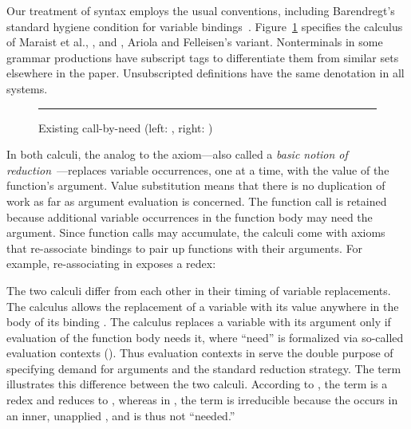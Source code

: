 \documentclass[runningheads,a4paper]{llncs}
\begin{document}
 Our treatment of syntax employs the usual
 conventions, including Barendregt's standard hygiene condition
 for variable bindings~\cite{Barendregt1985LC}. Figure~\ref{fig:lneeds}
 specifies the calculus of Maraist et al., \lmow, and \laf,
 Ariola and Felleisen's variant. Nonterminals in some grammar productions have
 subscript tags to differentiate them from similar sets elsewhere in the
 paper. Unsubscripted definitions have the same denotation in all systems.

\newcommand{\smallmid}{\hspace{-.5pt}\mid\hspace{-0.5pt}}
\begin{figure}[htbp]
\vspace{-10pt}
\hspace{-14pt}\begin{minipage}[b]{0.49\linewidth}
  

\end{minipage}
\rule[-6pt]{.1pt}{4.5cm}
\hspace{-4pt}\begin{minipage}[b]{0.55\linewidth}
  

\end{minipage}
\vspace{-10pt}
  \caption{Existing call-by-need \lcs (left: \lmow, right: \laf)}
  \label{fig:lneeds}
\vspace{-10pt}
\end{figure}

In both calculi, the analog to the  axiom---also called a
 \textit{basic notion of reduction}~\cite{Barendregt1985LC}---replaces variable
 occurrences, one at a time, with the value 
 of the function's argument. Value substitution means that there is no
 duplication of work as far as argument evaluation is concerned. The function
 call is retained because additional variable occurrences in the function
 body may need the argument.
 Since function calls may accumulate, the calculi come with axioms
 that re-associate bindings to
 pair up functions with their arguments. For example,
 re-associating  in
 \laf exposes a \derefnr redex:
{

}

The two calculi differ from each other in their timing of variable
 replacements. The \lmow calculus allows the replacement of a variable with its
 value anywhere in the body of its binding . The \laf calculus
 replaces a variable with its argument only if evaluation of the function body
 needs it, where ``need'' is formalized via so-called evaluation contexts
 (). Thus evaluation contexts in \laf serve the double purpose of
 specifying demand for arguments and the standard reduction strategy. The term
  illustrates this difference between the two calculi.
 According to \lmow, the term is a \Vnr redex and reduces to
 , whereas in \laf, the term is irreducible because the
  occurs in an inner, unapplied , and is thus not ``needed.''
\end{document}
